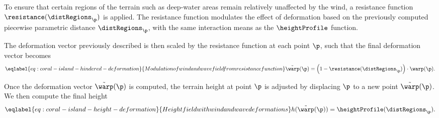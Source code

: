 
To ensure that certain regions of the terrain such as deep-water areas remain relatively unaffected by the wind, a resistance function $\resistance(\distRegions_\p)$ is applied. The resistance function modulates the effect of deformation based on the previously computed piecewise parametric distance $\distRegions_\p$, with the same interaction means as the $\heightProfile$ function. %


The deformation vector previously described is then scaled by the resistance function at each point $\p$, such that the final deformation vector becomes
\begin{align}
    \eqlabel{eq:coral-island-hindered-deformation}{Modulation of wind and wave field from resistance function}
    \Tilde{\warp}(\p) = \left(1 - \resistance(\distRegions_\p) \right) \cdot \warp(\p).
\end{align}


Once the deformation vector $\Tilde{\warp}(\p)$ is computed, the terrain height at point $\p$ is adjusted by displacing $\p$ to a new point $\Tilde{\warp}(\p)$.
We then compute the final height 
\begin{align}
    \eqlabel{eq:coral-island-height-deformation}{Height field with wind and wave deformations}
    h(\Tilde{\warp}(\p)) = \heightProfile(\distRegions_{\p}).
\end{align}

